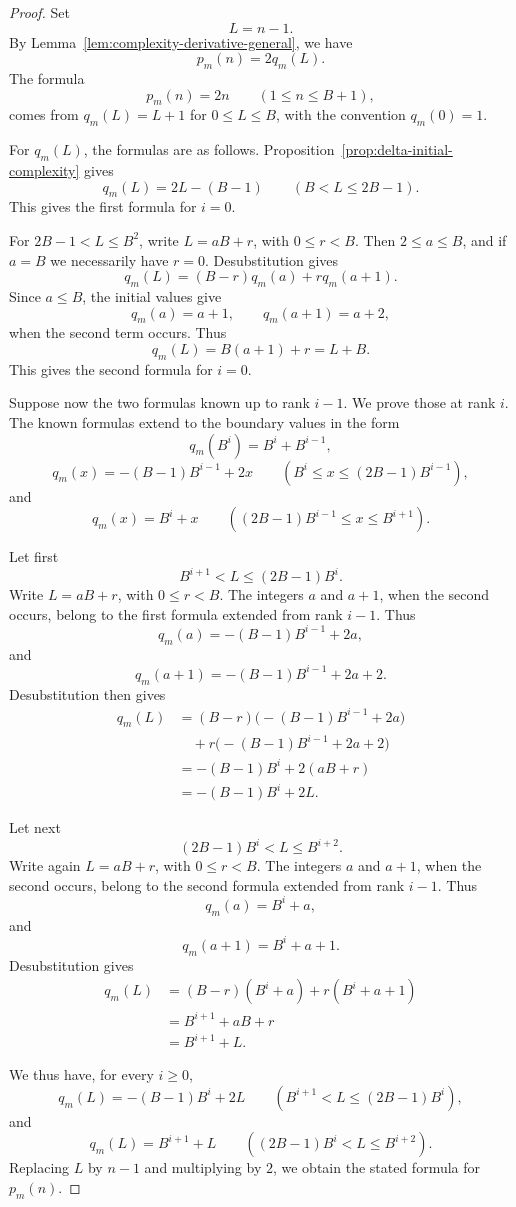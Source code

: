 \documentclass[10pt,a4paper]{amsart}
\begin{document}
\begin{proof}
Set
\[
  L = n - 1.
\]
By Lemma~\ref{lem:complexity-derivative-general}, we have
\[
  p_m(n) = 2 q_m(L).
\]
The formula
\[
  p_m(n) = 2n \qquad (1 \le n \le B + 1),
\]
comes from $q_m(L) = L + 1$ for $0 \le L \le B$, with the convention $q_m(0) = 1$.

For $q_m(L)$, the formulas are as follows. Proposition~\ref{prop:delta-initial-complexity} gives
\[
  q_m(L) = 2L - (B - 1) \qquad (B < L \le 2B - 1).
\]
This gives the first formula for $i = 0$.

For $2B - 1 < L \le B^2$, write $L = aB + r$, with $0 \le r < B$. Then $2 \le a \le B$, and if $a = B$ we necessarily have $r = 0$. Desubstitution gives
\[
  q_m(L) = (B - r) q_m(a) + r q_m(a + 1).
\]
Since $a \le B$, the initial values give
\[
  q_m(a) = a + 1, \qquad q_m(a + 1) = a + 2,
\]
when the second term occurs. Thus
\[
  q_m(L) = B(a + 1) + r = L + B.
\]
This gives the second formula for $i = 0$.

Suppose now the two formulas known up to rank $i - 1$. We prove those at rank $i$. The known formulas extend to the boundary values in the form
\[
  q_m(B^i) = B^i + B^{i-1},
\]
\[
  q_m(x) = -(B - 1) B^{i-1} + 2x \qquad (B^i \le x \le (2B - 1) B^{i-1}),
\]
and
\[
  q_m(x) = B^i + x \qquad ((2B - 1) B^{i-1} \le x \le B^{i+1}).
\]

Let first
\[
  B^{i+1} < L \le (2B - 1) B^i.
\]
Write $L = aB + r$, with $0 \le r < B$. The integers $a$ and $a + 1$, when the second occurs, belong to the first formula extended from rank $i - 1$. Thus
\[
  q_m(a) = -(B - 1) B^{i-1} + 2a,
\]
and
\[
  q_m(a + 1) = -(B - 1) B^{i-1} + 2a + 2.
\]
Desubstitution then gives
\[
\begin{aligned}
  q_m(L) &= (B - r) \bigl(-(B - 1) B^{i-1} + 2a\bigr) \\
         &\quad + r \bigl(-(B - 1) B^{i-1} + 2a + 2\bigr) \\
         &= -(B - 1) B^i + 2(aB + r) \\
         &= -(B - 1) B^i + 2L.
\end{aligned}
\]

Let next
\[
  (2B - 1) B^i < L \le B^{i+2}.
\]
Write again $L = aB + r$, with $0 \le r < B$. The integers $a$ and $a + 1$, when the second occurs, belong to the second formula extended from rank $i - 1$. Thus
\[
  q_m(a) = B^i + a,
\]
and
\[
  q_m(a + 1) = B^i + a + 1.
\]
Desubstitution gives
\[
\begin{aligned}
  q_m(L) &= (B - r)(B^i + a) + r(B^i + a + 1) \\
         &= B^{i+1} + aB + r \\
         &= B^{i+1} + L.
\end{aligned}
\]

We thus have, for every $i \ge 0$,
\[
  q_m(L) = -(B - 1) B^i + 2L \qquad (B^{i+1} < L \le (2B - 1) B^i),
\]
and
\[
  q_m(L) = B^{i+1} + L \qquad ((2B - 1) B^i < L \le B^{i+2}).
\]
Replacing $L$ by $n - 1$ and multiplying by $2$, we obtain the stated formula for $p_m(n)$.
\end{proof}
\end{document}
